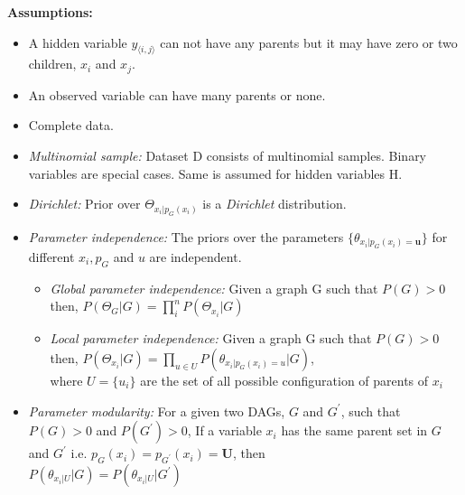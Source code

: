 \documentclass[]{article}
\begin{document}
\textbf{Assumptions:}
	\begin{itemize}
		\item A hidden variable $y_{\langle i, j \rangle}$ can not have any parents but it may have zero or two children, $x_i$ and $x_j$.
		\item An observed variable can have many parents or none.
		\item Complete data.
		\item \textit{Multinomial sample:} Dataset D consists of multinomial samples. Binary variables are special cases. Same is assumed for hidden variables H.
		\item \textit{Dirichlet:} Prior over $\Theta_{x_i | p_G \left( x_i \right) }$ is a \textit{Dirichlet} distribution. 
		\item \textit{Parameter independence:} The priors over the parameters $ \lbrace \theta_{x_i | p_G \left( x_i \right)=\textbf{u} } \rbrace $  for different $x_i, p_G$ and $u$ are independent.
		\begin{itemize}
			\item \textit{Global parameter independence:} Given a graph G such that $P\left(G\right) > 0$ then, 
								$P\left( \Theta_G | G \right) = \prod_i^n P \left( \Theta_{x_i} | G\right) $ 
			\item \textit{Local parameter independence:}  Given a graph G such that $P\left(G\right) > 0$ then, 
								$ P \left( \Theta_{x_i} | G\right) = \prod_{u \in U} P \left( \theta_{x_i | p_G \left( x_i \right)=u } | G\right) $, \\where $ U=\lbrace u_i \rbrace$ are the set of all possible configuration of parents of $x_i$
		\end{itemize}
		\item \textit{Parameter modularity:} For a given two DAGs, $G$ and $G^{'}$, such that $P\left(G\right) > 0$ and $P\left( G^{'} \right) > 0$, If a variable $x_i$ has the same parent set in $G$ and $G^{'}$ i.e. $p_G\left(x_i\right)= p_{G^{'}}\left(x_i\right)= \textbf{U}$, then \\
					$  P \left( \theta_{x_i | U } | G\right) =  P \left( \theta_{x_i | U } | G^{'}\right)$ 
		
	\end{itemize}
	
\end{document}
